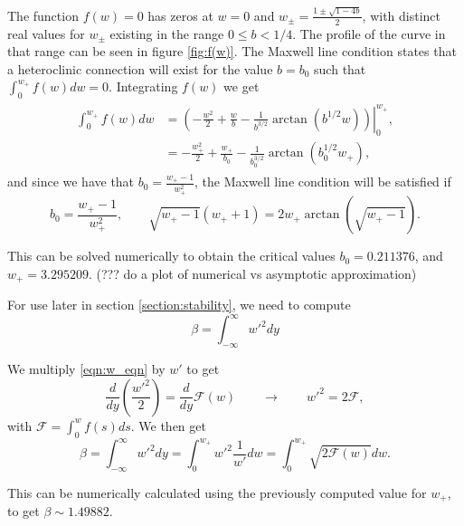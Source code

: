 \documentclass[a4paper,10pt]{article}
\begin{document}
The function $f(w)=0$ has zeros at $w=0$ and $w_{\pm} = \frac{1\pm\sqrt{1-4b}}{2}$, with distinct real values for $w_{\pm}$ existing in the range $0\le b<1/4$. The profile of the curve in that range can be seen in figure \ref{fig:f(w)}. The Maxwell line condition states that a heteroclinic connection will exist for the value $b=b_0$ such that $\int_0^{w_+} f(w)dw = 0$. Integrating $f(w)$ we get
% 
\begin{equation}
\label{eqn:maxwell_lc}
\begin{split}
\begin{aligned}
  \int_0^{w_+} f(w)dw &= \left.\left(-\frac{w^2}{2} + \frac{w}{b} - \frac{1}{b^{3/2}}\arctan(b^{1/2}w) \right)\right|_0^{w_+},\\
  & = -\frac{w_+^2}{2} + \frac{w_+}{b_0} - \frac{1}{b_0^{3/2}}\arctan(b_0^{1/2}w_+),
\end{aligned}
\end{split}
\end{equation}
% 
and since we have that $b_0 = \frac{w_+-1}{w_+^2}$, the Maxwell line condition will be satisfied if
% 
\begin{equation}
\label{eqn:maxwell2}
b_0 = \frac{w_+-1}{w_+^2},\qquad \sqrt{w_+-1}(w_++1)=2w_+\arctan(\sqrt{w_+-1}).
\end{equation}

This can be solved numerically to obtain the critical values $b_0 = 0.211376$, and $w_+ = 3.295209$. (??? do a plot of numerical vs asymptotic approximation)

For use later in section \ref{section:stability}, we need to compute
% 
$$
\beta = \int_{-\infty}^{\infty}w'^2dy
$$
% 

We multiply \eqref{eqn:w_eqn} by $w'$ to get 
% 
\begin{equation}
  \frac{d}{dy}\left(\frac{w'^2}{2} \right)=\frac{d}{dy}\mathcal{F}(w)\qquad\rightarrow\qquad w'^2 = 2\mathcal{F},
\end{equation}
% 
with $\mathcal{F} = \int_0^wf(s)ds$. We then get
% 
\begin{equation}
\label{eqn:beta}
  \beta = \int_{-\infty}^{\infty}w'^2dy = \int_{0}^{w_+}w'^2\frac{1}{w'} dw = \int_{0}^{w_+}\sqrt{2\mathcal{F}(w)}dw.
\end{equation}
% 

This can be numerically calculated using the previously computed value for $w_+$, to get $\beta\sim1.49882$.
\end{document}
